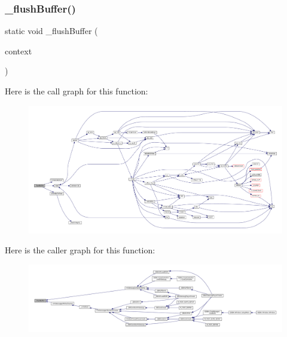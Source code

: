 \subsubsection{\texorpdfstring{\+\_\+flush\+Buffer()}{\_flushBuffer()}}
{\footnotesize\ttfamily static void \+\_\+flush\+Buffer (\begin{DoxyParamCaption}\item[{struct m\+Video\+Log\+Context $\ast$}]{context }\end{DoxyParamCaption})\hspace{0.3cm}{\ttfamily [static]}}

Here is the call graph for this function\+:
\nopagebreak
\begin{figure}[H]
\begin{center}
\leavevmode
\includegraphics[width=350pt]{video-logger_8c_a7a65448771b3eb66410f5d1e4537e322_cgraph}
\end{center}
\end{figure}
Here is the caller graph for this function\+:
\nopagebreak
\begin{figure}[H]
\begin{center}
\leavevmode
\includegraphics[width=350pt]{video-logger_8c_a7a65448771b3eb66410f5d1e4537e322_icgraph}
\end{center}
\end{figure}
\mbox{\label{video-logger_8c_af04fe8e7da4383d4c2de8bd267880974}} 
